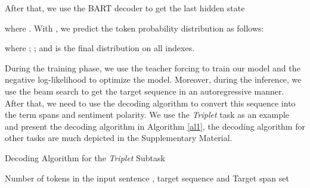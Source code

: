 \documentclass[11pt,a4paper]{article}
\begin{document}
After that, we use the BART decoder to get the last hidden state

where . With , we predict the token probability distribution  as follows:

where ;  ; and  is the final distribution on all indexes.



During the training phase, we use the teacher forcing to train our model and the negative log-likelihood to optimize the model. Moreover, during the inference, we use the beam search to get the target sequence  in an autoregressive manner. After that, we need to use the decoding algorithm to convert this sequence into the term spans and sentiment polarity. We use the \emph{Triplet} task as an example and present the decoding algorithm in Algorithm \ref{al1}, the decoding algorithm for other tasks are much depicted in the Supplementary Material.

\begin{algorithm}[ht]
  \begin{algorithmic}[1]
    \caption{Decoding Algorithm for the \emph{Triplet} Subtask} \label{al1}
    \Require Number of tokens in the input sentence , target sequence  and 
    \Ensure  Target span set  
    \State 
    \While{}
      \State 
      \If{}
      \State  
      \State 
      \Else
      \State 
      \EndIf
      \State 
    \EndWhile
    \State \Return{}
  \end{algorithmic}
\end{algorithm}
\end{document}
